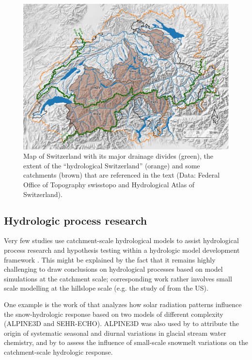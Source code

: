 \documentclass[10pt,a4paper]{article}
\begin{document}
\begin{figure}[htb]
	\begin{center}
		\includegraphics[width=0.95\columnwidth]{figures/map}
		\caption{{Map of Switzerland with its major drainage divides (green), the extent
				of the ``hydrological Switzerland'' (orange) and some catchments (brown)
				that are referenced in the text (Data: Federal Office of Topography
				swisstopo and Hydrological Atlas of Switzerland). 
				\label{fig:map}
		}}
	\end{center}
\end{figure}

\subsection{Hydrologic process research}
\label{sec:application:process}

Very few studies use catchment-scale hydrological models to assist hydrological process research and hypothesis testing within a hydrologic model development framework \citep{clarkOpinion2016}. This might be explained by the fact that it remains highly challenging to draw conclusions on hydrological processes based on model simulations at the catchment scale; corresponding work rather involves small scale modelling at the hillslope scale (e.g. the study of \citealt{Heuvel2018} from the US).  

One example is the work of \citet{Comola2017} that analyzes how solar radiation patterns influence the snow-hydrologic response based on two models of different complexity (ALPINE3D and SEHR-ECHO). ALPINE3D was also used by \citet{Hindshaw2011} to attribute the origin of systematic seasonal and diurnal variations in glacial stream water chemistry, and by \citet{Brauchli2017} to assess the influence of small-scale snowmelt variations on the catchment-scale hydrologic response.
\end{document}
